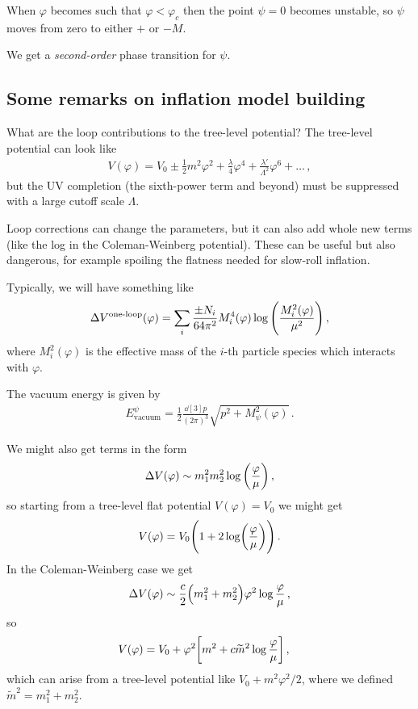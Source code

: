 \documentclass[main.tex]{subfiles}
\begin{document}
When \(\varphi \) becomes such that \(\varphi < \varphi _c\) then the point \(\psi = 0\) becomes unstable, so \(\psi \) moves from zero to either \(+\) or \(-M\).  

We get a \emph{second-order} phase transition for \(\psi \). 

\subsection{Some remarks on inflation model building}

What are the loop contributions to the tree-level potential?
The tree-level potential can look like 
%
\begin{align}
V(\varphi ) = V_0 \pm \frac{1}{2} m^2 \varphi^2 + \frac{\lambda}{4} \varphi^{4} + \frac{\lambda '}{\Lambda^2} \varphi^{6} + \dots
\,,
\end{align}
%
but the UV completion (the sixth-power term and beyond) must be suppressed with a large cutoff scale \(\Lambda \). 

Loop corrections can change the parameters, but it can also add whole new terms (like the log in the Coleman-Weinberg potential). 
These can be useful but also dangerous, for example spoiling the flatness needed for slow-roll inflation. 

Typically, we will have something like 
%
\begin{align}
\Delta V^{\text{one-loop}}(\varphi )
= \sum _{i} \frac{\pm N_i}{64 \pi^2}
M_i^{4} (\varphi ) \log \qty(\frac{M_i^2 (\varphi )}{\mu^2})
\,,
\end{align}
%
where \(M_i^2(\varphi )\) is the effective mass of the \(i\)-th particle species which interacts with \(\varphi \). 

The vacuum energy is given by 
%
\begin{align}
E^{\psi } _{\text{vacuum}} = \frac{1}{2} \frac{ \dd[3]{p}}{(2 \pi )^3}
\sqrt{p^2 + M^2_\psi (\varphi )}
\,.
\end{align}

We might also get terms in the form 
%
\begin{align}
\Delta V(\varphi ) \sim m_1^2 m_2^2 \log \qty( \frac{\varphi}{\mu })
\,,
\end{align}
%
so starting from a tree-level flat potential \(V(\varphi ) = V_0 \) we might get 
%
\begin{align}
V(\varphi ) = V_0 \qty(1 + 2 \log (\frac{\varphi }{\mu }))
\,.
\end{align}
%
In the Coleman-Weinberg case we get 
%
\begin{align}
\Delta V(\varphi ) \sim \frac{c}{2} \qty(m_1^2+ m_2^2) \varphi^2 \log \frac{\varphi }{\mu }
\,,
\end{align}
%
so 
%
\begin{align}
V(\varphi ) &= V_0 + \varphi^2 \qty[m^2 + c \widetilde{m}^2 \log \frac{\varphi }{\mu }]
\,,
\end{align}
%
which can arise from a tree-level potential like \(V_0 + m^2 \varphi^2 / 2\), where we defined \(\widetilde{m}^2 = m_1^2 + m_2^2\). 
\end{document}

